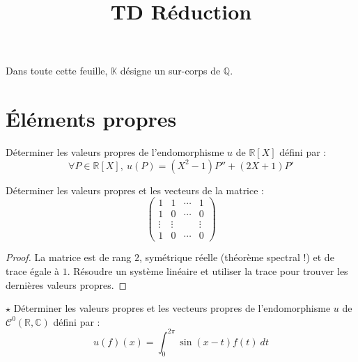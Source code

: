 \documentclass[french,a4paper]{article}
\title{TD Réduction}
\newcommand{\Q}{\mathbb{Q}}
\newcommand{\R}{\mathbb{R}}
\newcommand{\C}{\mathbb{C}}
\newcommand{\K}{\mathbb{K}}
\theoremstyle{plain}
\theoremstyle{definition}
\theoremstyle{remark}
\begin{document}
\maketitle

Dans toute cette feuille, $\K$ désigne un sur-corps de $\Q$.

\section{Éléments propres}

\begin{ex}{}
	Déterminer les valeurs propres de l'endomorphisme $u$ de $\R[X]$ défini par : $$\forall P\in\R[X],\ u(P)=(X^2-1)P''+(2X+1)P'$$
\end{ex}

\begin{ex}{}
	Déterminer les valeurs propres et les vecteurs de la matrice : $$\begin{pmatrix}
		1&1&\cdots&1\\
		1&0&\cdots&0\\
		\vdots&\vdots&&\vdots\\
		1&0&\cdots&0
	\end{pmatrix}$$
\end{ex}
\begin{proof}
	La matrice est de rang $2$, symétrique réelle (théorème spectral !) et de trace égale à $1$. Résoudre un système linéaire et utiliser la trace pour trouver les dernières valeurs propres.
\end{proof}

\begin{ex}{$\star$}
	Déterminer les valeurs propres et les vecteurs propres de l'endomorphisme $u$ de $\mathcal{C}^0(\R,\C)$ défini par : $$u(f)(x)=\int_{0}^{2\pi}\sin(x-t)f(t)\ dt$$
\end{ex}
\end{document}
